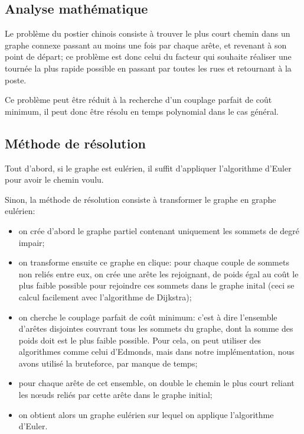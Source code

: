 \documentclass{scrartcl}
\begin{document}
  \subsection{Analyse mathématique}
    Le problème du postier chinois consiste à trouver le plus court chemin dans
    un graphe connexe passant au moins une fois par chaque arête, et revenant
    à son point de départ; ce problème est donc celui du facteur qui souhaite
    réaliser une tournée la plus rapide possible en passant par toutes les rues
    et retournant à la poste. 

    Ce problème peut être réduit à la recherche d'un couplage parfait de coût
    minimum, il peut donc être résolu en temps polynomial dans le cas général.

  \subsection{Méthode de résolution}
    Tout d'abord, si le graphe est eulérien, il suffit d'appliquer l'algorithme
    d'Euler pour avoir le chemin voulu.

    Sinon, la méthode de résolution consiste à transformer le graphe en graphe
    eulérien:
    \begin{itemize}
      \item on crée d'abord le graphe partiel contenant uniquement les sommets
        de degré impair;
      \item on transforme ensuite ce graphe en clique: pour chaque couple de
        sommets non reliés entre eux, on crée une arête les rejoignant,
        de poids égal au coût le plus faible possible pour rejoindre ces
        sommets dans le graphe inital (ceci se calcul facilement avec
        l'algorithme de Dijkstra);
      \item on cherche le couplage parfait de coût minimum: c'est à dire
        l'ensemble d'arêtes disjointes couvrant tous les sommets du graphe,
        dont la somme des poids doit est le plus faible possible.
        Pour cela, on peut utiliser des algorithmes comme celui d'Edmonds, mais
        dans notre implémentation, nous avons utilisé la bruteforce, par manque
        de temps;
      \item pour chaque arête de cet ensemble, on double le chemin le plus court
        reliant les nœuds reliés par cette arête dans le graphe initial;
      \item on obtient alors un graphe eulérien sur lequel on applique
        l'algorithme d'Euler.
    \end{itemize}
\end{document}
